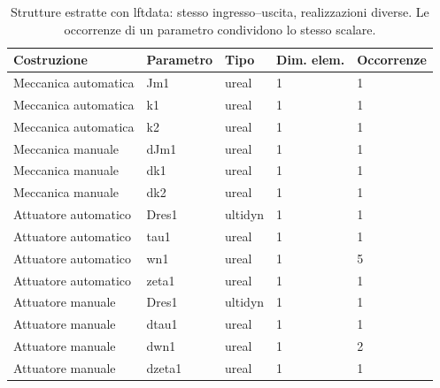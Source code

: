 \begin{table}[htbp]\centering\small
\begin{tabular}{lllll}\toprule
Costruzione & Parametro & Tipo & Dim. elem. & Occorrenze\\\midrule
Meccanica automatica & Jm1 & ureal & 1 & 1\\
Meccanica automatica & k1 & ureal & 1 & 1\\
Meccanica automatica & k2 & ureal & 1 & 1\\
Meccanica manuale & dJm1 & ureal & 1 & 1\\
Meccanica manuale & dk1 & ureal & 1 & 1\\
Meccanica manuale & dk2 & ureal & 1 & 1\\
Attuatore automatico & Dres1 & ultidyn & 1 & 1\\
Attuatore automatico & tau1 & ureal & 1 & 1\\
Attuatore automatico & wn1 & ureal & 1 & 5\\
Attuatore automatico & zeta1 & ureal & 1 & 1\\
Attuatore manuale & Dres1 & ultidyn & 1 & 1\\
Attuatore manuale & dtau1 & ureal & 1 & 1\\
Attuatore manuale & dwn1 & ureal & 1 & 2\\
Attuatore manuale & dzeta1 & ureal & 1 & 1\\
\bottomrule\end{tabular}
\caption{Strutture estratte con lftdata: stesso ingresso--uscita, realizzazioni diverse. Le occorrenze di un parametro condividono lo stesso scalare.}
\end{table}
